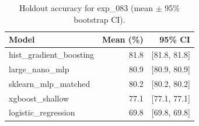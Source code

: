 \begin{table}[ht]
\centering
\caption{Holdout accuracy for exp_083 (mean $\pm$ 95\% bootstrap CI).}
\label{tab:exp_083}
\begin{tabular}{lrr}
\toprule
Model & Mean (\%) & 95\% CI \\
\midrule
hist\_gradient\_boosting & 81.8 & [81.8, 81.8] \\
large\_nano\_mlp & 80.9 & [80.9, 80.9] \\
sklearn\_mlp\_matched & 80.2 & [80.2, 80.2] \\
xgboost\_shallow & 77.1 & [77.1, 77.1] \\
logistic\_regression & 69.8 & [69.8, 69.8] \\
\bottomrule
\end{tabular}
\end{table}
